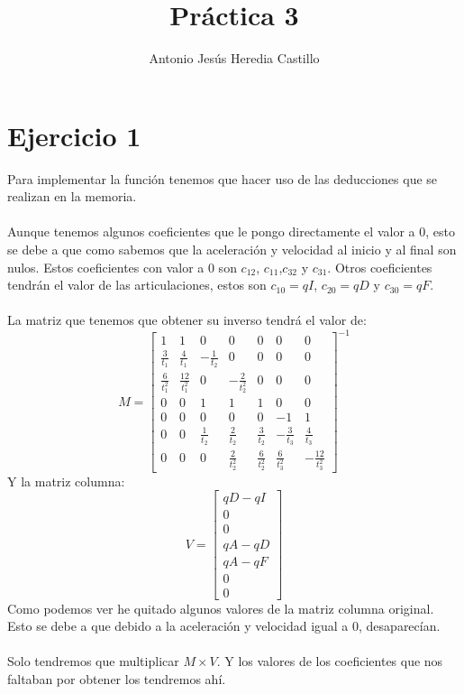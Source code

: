 \documentclass[12pt,a4paper]{report}
\title{Práctica 3}
\author{Antonio Jesús Heredia Castillo}
\begin{document}
\maketitle

\section*{Ejercicio 1}
Para implementar la función tenemos que hacer uso de las deducciones que se realizan en la memoria.\\
\\
 Aunque tenemos algunos coeficientes que le pongo directamente el valor a 0, esto se debe a que como sabemos que la aceleración y velocidad al inicio y al final son nulos. Estos coeficientes con valor a 0 son $c_{12}$, $c_{11}$,$c_{32}$ y $c_{31}$. Otros coeficientes tendrán el valor de las articulaciones, estos son $c_{10}=qI$, $c_{20}=qD$ y $c_{30}=qF$.\\
 \\
 La matriz que tenemos que obtener su inverso tendrá el valor de:
 $$M=\left[\begin{array}{ccccccc}
 1 & 1 & 0 & 0 & 0 & 0 & 0 \\
 \frac{3}{t_{1}} & \frac{4}{t_{1}} & -\frac{1}{t_{2}} & 0 & 0 & 0 & 0 \\
 \frac{6}{t_{1}^{2}} & \frac{12}{t_{1}^{2}} & 0 & -\frac{2}{t_{2}^{2}} & 0 & 0 & 0 \\
 0 & 0 & 1 & 1 & 1 & 0 & 0 \\
 0 & 0 & 0 & 0 & 0 & -1 & 1 \\
 0 & 0 & \frac{1}{t_{2}} & \frac{2}{t_{2}} & \frac{3}{t_{2}} & -\frac{3}{t_{3}} & \frac{4}{t_{3}} \\
 0 & 0 & 0 & \frac{2}{t_{2}^{2}} & \frac{6}{t_{2}^{2}} & \frac{6}{t_{3}^{2}} & -\frac{12}{t_{3}^{2}}
 \end{array}\right]^{-1}$$
 Y la matriz columna:
 $$V=\left[\begin{array}{c}
 qD-qI\\
 0\\
 0 \\
 qA-qD \\
 qA-qF\\
 0\\
 0
 \end{array}\right]$$
 Como podemos ver he quitado algunos valores de la matriz columna original. Esto se debe a que debido a la aceleración y velocidad igual a 0, desaparecían.\\
 \\
 Solo tendremos que multiplicar $M\times V$. Y los valores de los coeficientes que nos faltaban por obtener los tendremos ahí.
\end{document}
